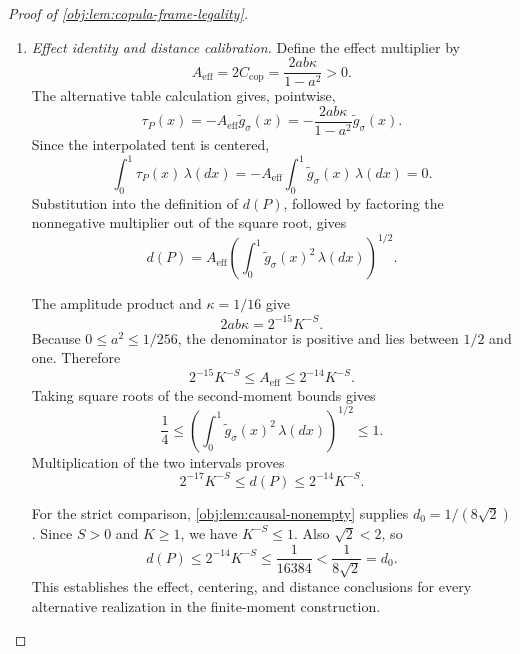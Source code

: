 \begin{proof}[Proof of \cref{obj:lem:copula-frame-legality}]
\begin{enumerate}
For the exact coarse second moment, direct integration gives
\[
\int_0^1 b_\triangle(r_\triangle)^2\,dr_\triangle
=2\int_0^{1/2}(2r_\triangle)^2\,dr_\triangle
=\frac13.
\]
Each coarse cell therefore contributes \(1/(3M)\). The cell interiors are disjoint, the signs square to one, and the even rank supplies all \(M\) cells, so
\[
\int_0^1g_\sigma(x)^2\,\lambda(dx)=\frac13.
\]
Pointwise, the error estimate and the elementary square inequality give
\[
\begin{aligned}
g_\sigma(x)^2
&\le2\widetilde g_\sigma(x)^2
   +2\{\widetilde g_\sigma(x)-g_\sigma(x)\}^2\\
&\le2\widetilde g_\sigma(x)^2+\frac18.
\end{aligned}
\]
Integration against the probability measure \(\lambda\) yields
\[
\frac13
\le2\int_0^1\widetilde g_\sigma(x)^2\,\lambda(dx)+\frac18,
\]
which implies the lower bound below. The upper bound follows from the unit envelope:
\[
\frac1{16}
\le\int_0^1\widetilde g_\sigma(x)^2\,\lambda(dx)
\le\int_0^1 1\,\lambda(dx)=1.
\]

\item \textit{Effect identity and distance calibration.}
Define the effect multiplier by
\[
A_{\mathrm{eff}}
=2C_{\mathrm{cop}}
=\frac{2ab\kappa}{1-a^2}>0.
\]
The alternative table calculation gives, pointwise,
\[
\tau_P(x)=-A_{\mathrm{eff}}\widetilde g_\sigma(x)
=-\frac{2ab\kappa}{1-a^2}\widetilde g_\sigma(x).
\]
Since the interpolated tent is centered,
\[
\int_0^1\tau_P(x)\,\lambda(dx)
=-A_{\mathrm{eff}}
 \int_0^1\widetilde g_\sigma(x)\,\lambda(dx)=0.
\]
Substitution into the definition of \(d(P)\), followed by factoring the nonnegative multiplier out of the square root, gives
\[
d(P)
=A_{\mathrm{eff}}
 \left(\int_0^1\widetilde g_\sigma(x)^2\,\lambda(dx)\right)^{1/2}.
\]

The amplitude product and \(\kappa=1/16\) give
\[
2ab\kappa=2^{-15}K^{-S}.
\]
Because \(0\le a^2\le1/256\), the denominator is positive and lies between \(1/2\) and one. Therefore
\[
2^{-15}K^{-S}
\le A_{\mathrm{eff}}
\le2^{-14}K^{-S}.
\]
Taking square roots of the second-moment bounds gives
\[
\frac14
\le
\left(\int_0^1\widetilde g_\sigma(x)^2\,\lambda(dx)\right)^{1/2}
\le1.
\]
Multiplication of the two intervals proves
\[
2^{-17}K^{-S}\le d(P)\le2^{-14}K^{-S}.
\]

For the strict comparison, \cref{obj:lem:causal-nonempty} supplies
\(d_0=1/(8\sqrt2)\). Since \(S>0\) and \(K\ge1\), we have
\(K^{-S}\le1\). Also \(\sqrt2<2\), so
\[
d(P)\le2^{-14}K^{-S}
\le\frac1{16384}
<\frac1{8\sqrt2}=d_0.
\]
This establishes the effect, centering, and distance conclusions for every alternative realization in the finite-moment construction.


\end{enumerate}
\end{proof}
